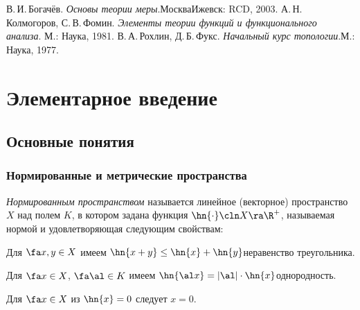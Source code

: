 \documentclass[a4paper]{article}
\begin{document}
\begin{thebibliography}{4}
\setlength\itemsep{-.5mm}
В.\,И.\,Богачёв. \emph{Основы теории меры}.\т Москва\т Ижевск: RCD, 2003.
    А.\,Н.\,Колмогоров, С.\,В.\,Фомин. \emph{Элементы теории функций и функционального анализа}.\т
    М.: Наука, 1981.
В.\,А.\,Рохлин, Д.\,Б.\,Фукс. \emph{Начальный курс топологии}.\т М.: Наука, 1977.
\end{thebibliography}

\pagebreak
\pagestyle{headings}

\makeatletter
  \renewcommand{\headheight}{11mm}
  \renewcommand{\headsep}{2mm}
  \renewcommand{\sectionmark}[1]{}
  \renewcommand{\subsectionmark}[1]{}
  \renewcommand{\subsubsectionmark}[1]{\markright{\thesubsubsection. #1}}
  \renewcommand{\@oddhead}{\vbox{\hbox to \textwidth{\scriptsize\thepage\hfil\rightmark\strut}\hrule}}
  \renewcommand{\@oddfoot}{\hfil\thepage\hfil}
\makeatother

\section{Элементарное введение}

\subsection{Основные понятия}

\subsubsection{Нормированные и метрические пространства}

\begin{df}
\emph{Нормированным пространством} называется линейное (векторное) пространство $X$ над полем $K$,
в котором задана функция $\hn{\cdot}\cln X \ra \R^+$, называемая нормой
и удовлетворяющая следующим свойствам:
\begin{points}{-3}
\item Для $\fa x, y \in X$ имеем $\hn{x+y} \le \hn{x} + \hn{y}$\т неравенство треугольника.
\item Для $\fa x \in X$, $\fa \al \in K$ имеем $\hn{\al x} = |\al|\cdot\hn{x}$\т однородность.
\item Для $\fa x \in X$ из $\hn{x} = 0$ следует $x = 0$.
\end{points}
\end{df}
\end{document}
